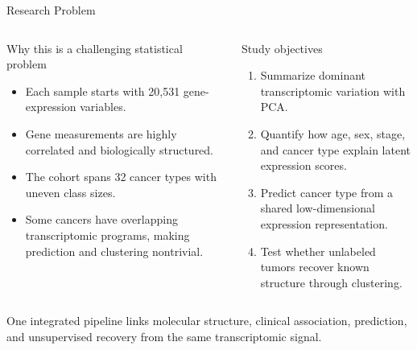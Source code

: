 \documentclass[aspectratio=169,10pt]{beamer}
\begin{document}
\begin{frame}{Research Problem}
  \begin{columns}[T,onlytextwidth]
      \begin{block}{Why this is a challenging statistical problem}
        \small
        \begin{itemize}
          \item Each sample starts with \alert{20,531 gene-expression variables}.
          \item Gene measurements are highly correlated and biologically structured.
          \item The cohort spans \alert{32 cancer types} with uneven class sizes.
          \item Some cancers have overlapping transcriptomic programs, making prediction and clustering nontrivial.
        \end{itemize}
      \end{block}
      \begin{block}{Study objectives}
        \small
        \begin{enumerate}
          \item Summarize dominant transcriptomic variation with PCA.
          \item Quantify how age, sex, stage, and cancer type explain latent expression scores.
          \item Predict cancer type from a shared low-dimensional expression representation.
          \item Test whether unlabeled tumors recover known structure through clustering.
        \end{enumerate}
      \end{block}
    \end{columns}
    \vspace{0.1cm}
    {\small\color{DeckSoft}One integrated pipeline links molecular structure, clinical association, prediction, and unsupervised recovery from the same transcriptomic signal.\par}
\end{frame}
\end{document}
